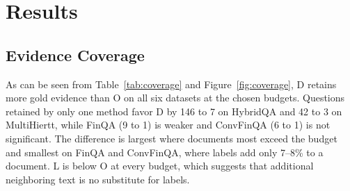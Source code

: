 \documentclass[11pt]{article}
\begin{document}
\begin{table}[t]
\centering\footnotesize\setlength{\tabcolsep}{3pt}
\caption{Model and inference configuration (from the frozen run contracts).}
\label{tab:model}
\end{table}

\section{Results}
\label{sec:results}
\subsection{Evidence Coverage}
As can be seen from Table~\ref{tab:coverage} and Figure~\ref{fig:coverage}, D retains
more gold evidence than O on all six datasets at the chosen budgets. Questions retained
by only one method favor D by 146 to 7 on HybridQA and 42 to 3 on MultiHiertt, while
FinQA (9 to 1) is weaker and ConvFinQA (6 to 1) is not significant. The difference is
largest where documents most exceed the budget and smallest on FinQA and ConvFinQA, where
labels add only 7--8\% to a document. L is below O at every budget, which suggests that
additional neighboring text is no substitute for labels.

\begin{table}[t]
\centering\footnotesize\setlength{\tabcolsep}{2pt}

\caption{Questions with all gold evidence retained (\%). D+/O+: kept only by D or only
by O; $p$: two-sided sign test.}
\label{tab:coverage}
\end{table}
\end{document}
